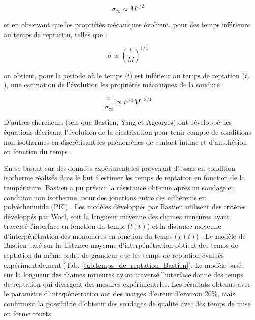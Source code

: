 \begin{equation}
\sigma_{\infty} \propto M^{1/2}
\end{equation}

et en observant que les propriétés mécaniques évoluent, pour des temps inférieurs au temps de reptation, telles que \cite{Wool1983} :

\begin{equation}
\sigma \propto \left( \frac{t}{M} \right) ^{1/4}
\end{equation}

on obtient, pour la période où le temps ($t$) est inférieur au temps de reptation ($t_r$), une estimation de l'évolution les propriétés mécaniques de la soudure \cite{Wool1983} : 

\begin{equation}
\frac{\sigma}{\sigma_{\infty}} \propto t^{1/4} M^{-3/4}
\end{equation}

D'autres chercheurs (tels que Bastien, Yang et Ageorges) ont développé des équations décrivant l'évolution de la cicatrisation pour tenir compte de conditions non isothermes en discrétisant les phénomènes de contact intime et d'autohésion en fonction du temps  \cite{Bastien1991,F.Yang2002,Ageorges1998}. 

En se basant sur des données expérimentales provenant d'essais en condition isotherme réalisés dans le but d'estimer les temps de reptation en fonction de la température, Bastien a pu prévoir la résistance obtenue après un soudage en condition non isotherme, pour des jonctions entre des adhérents en polyétherimide (PEI) \cite{Bastien1991}. 
Les modèles développés par Bastien utilisent des critères développés par Wool, soit la longueur moyenne des chaines mineures ayant traversé l'interface en fonction du temps ($l(t)$) et la distance moyenne d'interpénétration des monomères en fonction du temps ($\chi(t)$) \cite{Wool1983}. 
Le modèle de Bastien basé sur la distance moyenne d'interpénétration obtient des temps de reptation du même ordre de grandeur que les temps de reptation évalués expérimentalement (Tab. \ref{tab:temps_de_reptation_Bastien}). 
Le modèle basé sur la longueur des chaines mineures ayant traversé l'interface donne des temps de reptation qui divergent des mesures expérimentales. 
Les résultats obtenus avec le paramètre d'interpénétration ont des marges d'erreur d'environ 20\%, mais confirment la possibilité d'obtenir des soudages de qualité avec des temps de mise en forme courts.

